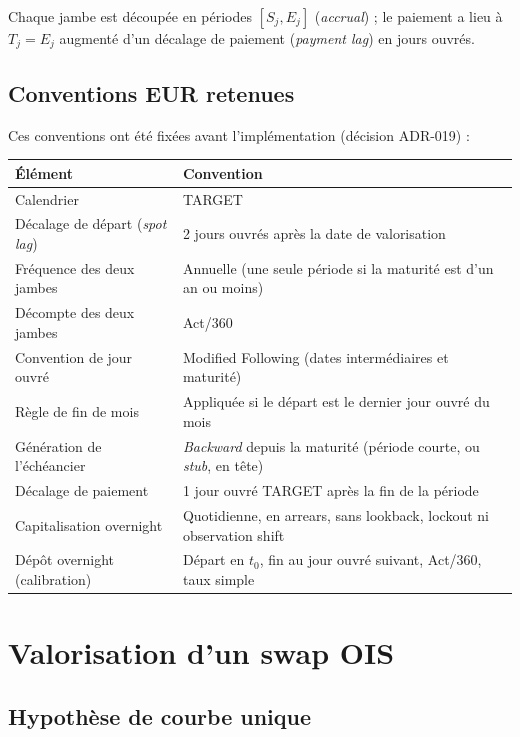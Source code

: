 \documentclass[11pt,a4paper]{article}
\theoremstyle{plain}
\theoremstyle{definition}
\theoremstyle{remark}
\begin{document}
Chaque jambe est découpée en périodes $[S_j,E_j]$ (\emph{accrual}) ; le paiement a lieu à
$T_j=E_j$ augmenté d'un décalage de paiement (\emph{payment lag}) en jours ouvrés.

\subsection{Conventions EUR retenues}\label{sec:conv-eur}

Ces conventions ont été fixées avant l'implémentation (décision ADR-019) :

\begin{center}
\begin{tabularx}{\linewidth}{@{}>{\raggedright\arraybackslash}p{5.7cm}X@{}}
\toprule
Élément & Convention\\
\midrule
Calendrier & TARGET\\
Décalage de départ (\emph{spot lag}) & 2 jours ouvrés après la date de valorisation\\
Fréquence des deux jambes & Annuelle (une seule période si la maturité est d'un an ou moins)\\
Décompte des deux jambes & Act/360\\
Convention de jour ouvré & Modified Following (dates intermédiaires et maturité)\\
Règle de fin de mois & Appliquée si le départ est le dernier jour ouvré du mois\\
Génération de l'échéancier & \emph{Backward} depuis la maturité (période courte, ou \emph{stub}, en tête)\\
Décalage de paiement & 1 jour ouvré TARGET après la fin de la période\\
Capitalisation overnight & Quotidienne, en arrears, sans lookback, lockout ni observation shift\\
Dépôt overnight (calibration) & Départ en $t_0$, fin au jour ouvré suivant, Act/360, taux simple\\
\bottomrule
\end{tabularx}
\end{center}

\section{Valorisation d'un swap OIS}\label{sec:pricing}

\subsection{Hypothèse de courbe unique}
\end{document}
